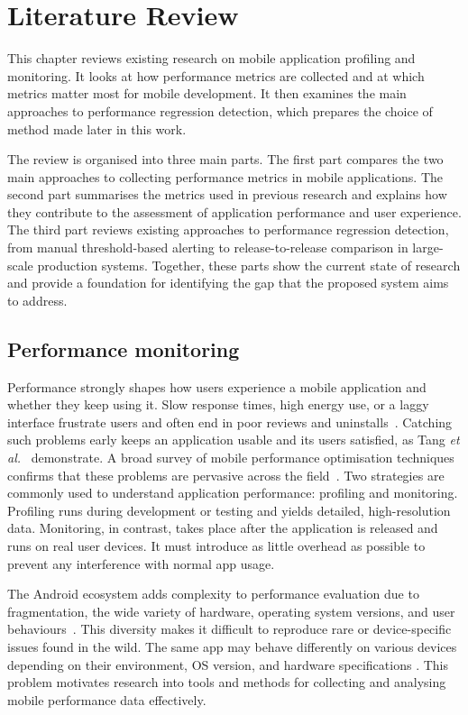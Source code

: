 \chapter{Literature Review}
\label{chap:lr}

This chapter reviews existing research on mobile application profiling and monitoring. It looks at how performance metrics are collected and at which metrics matter most for mobile development. It then examines the main approaches to performance regression detection, which prepares the choice of method made later in this work.

The review is organised into three main parts. The first part compares the two main approaches to collecting performance metrics in mobile applications. The second part summarises the metrics used in previous research and explains how they contribute to the assessment of application performance and user experience. The third part reviews existing approaches to performance regression detection, from manual threshold-based alerting to release-to-release comparison in large-scale production systems. Together, these parts show the current state of research and provide a foundation for identifying the gap that the proposed system aims to address.

\section{Performance monitoring}

Performance strongly shapes how users experience a mobile application and whether they keep using it. Slow response times, high energy use, or a laggy interface frustrate users and often end in poor reviews and uninstalls~\cite{Khalid2015}. Catching such problems early keeps an application usable and its users satisfied, as Tang \emph{et al.}~\cite{Tang} demonstrate. A broad survey of mobile performance optimisation techniques confirms that these problems are pervasive across the field~\cite{HortMobileSurvey}. Two strategies are commonly used to understand application performance: profiling and monitoring. Profiling runs during development or testing and yields detailed, high-resolution data. Monitoring, in contrast, takes place after the application is released and runs on real
user devices. It must introduce as little overhead as possible to prevent any interference with normal app usage.

The Android ecosystem adds complexity to performance evaluation due to fragmentation, the wide variety of hardware,
operating system versions, and user behaviours~\cite{Fragmentation, Crowdsourcing}. This diversity makes it difficult to reproduce rare
or device-specific issues found in the wild. The same app may behave differently on various devices depending on their
environment, OS version, and hardware specifications \cite{Zikan}. This problem motivates research into tools and
methods for collecting and analysing mobile performance data effectively.

